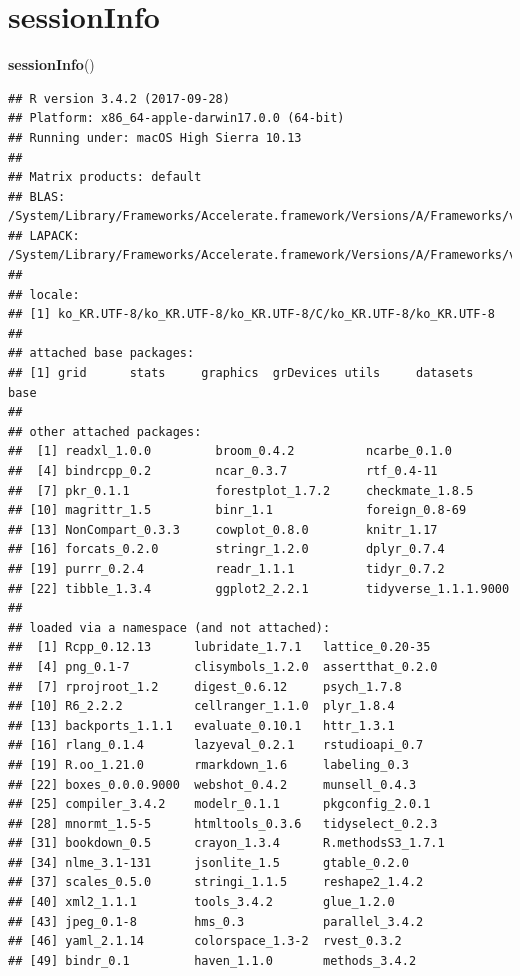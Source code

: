 \documentclass[12pt,]{krantz}
\newenvironment{Shaded}{\begin{snugshade}}{\end{snugshade}}
\newcommand{\KeywordTok}[1]{\textcolor[rgb]{0.13,0.29,0.53}{\textbf{#1}}}
\newcommand{\NormalTok}[1]{#1}
\theoremstyle{definition}
\theoremstyle{definition}
\theoremstyle{definition}
\theoremstyle{remark}
\begin{document}
\chapter*{sessionInfo}\label{sessioninfo}


\begin{Shaded}
\begin{Highlighting}[]
\KeywordTok{sessionInfo}\NormalTok{()}
\end{Highlighting}
\end{Shaded}

\begin{verbatim}
## R version 3.4.2 (2017-09-28)
## Platform: x86_64-apple-darwin17.0.0 (64-bit)
## Running under: macOS High Sierra 10.13
## 
## Matrix products: default
## BLAS: /System/Library/Frameworks/Accelerate.framework/Versions/A/Frameworks/vecLib.framework/Versions/A/libBLAS.dylib
## LAPACK: /System/Library/Frameworks/Accelerate.framework/Versions/A/Frameworks/vecLib.framework/Versions/A/libLAPACK.dylib
## 
## locale:
## [1] ko_KR.UTF-8/ko_KR.UTF-8/ko_KR.UTF-8/C/ko_KR.UTF-8/ko_KR.UTF-8
## 
## attached base packages:
## [1] grid      stats     graphics  grDevices utils     datasets  base     
## 
## other attached packages:
##  [1] readxl_1.0.0         broom_0.4.2          ncarbe_0.1.0        
##  [4] bindrcpp_0.2         ncar_0.3.7           rtf_0.4-11          
##  [7] pkr_0.1.1            forestplot_1.7.2     checkmate_1.8.5     
## [10] magrittr_1.5         binr_1.1             foreign_0.8-69      
## [13] NonCompart_0.3.3     cowplot_0.8.0        knitr_1.17          
## [16] forcats_0.2.0        stringr_1.2.0        dplyr_0.7.4         
## [19] purrr_0.2.4          readr_1.1.1          tidyr_0.7.2         
## [22] tibble_1.3.4         ggplot2_2.2.1        tidyverse_1.1.1.9000
## 
## loaded via a namespace (and not attached):
##  [1] Rcpp_0.12.13      lubridate_1.7.1   lattice_0.20-35  
##  [4] png_0.1-7         clisymbols_1.2.0  assertthat_0.2.0 
##  [7] rprojroot_1.2     digest_0.6.12     psych_1.7.8      
## [10] R6_2.2.2          cellranger_1.1.0  plyr_1.8.4       
## [13] backports_1.1.1   evaluate_0.10.1   httr_1.3.1       
## [16] rlang_0.1.4       lazyeval_0.2.1    rstudioapi_0.7   
## [19] R.oo_1.21.0       rmarkdown_1.6     labeling_0.3     
## [22] boxes_0.0.0.9000  webshot_0.4.2     munsell_0.4.3    
## [25] compiler_3.4.2    modelr_0.1.1      pkgconfig_2.0.1  
## [28] mnormt_1.5-5      htmltools_0.3.6   tidyselect_0.2.3 
## [31] bookdown_0.5      crayon_1.3.4      R.methodsS3_1.7.1
## [34] nlme_3.1-131      jsonlite_1.5      gtable_0.2.0     
## [37] scales_0.5.0      stringi_1.1.5     reshape2_1.4.2   
## [40] xml2_1.1.1        tools_3.4.2       glue_1.2.0       
## [43] jpeg_0.1-8        hms_0.3           parallel_3.4.2   
## [46] yaml_2.1.14       colorspace_1.3-2  rvest_0.3.2      
## [49] bindr_0.1         haven_1.1.0       methods_3.4.2
\end{verbatim}
\end{document}
